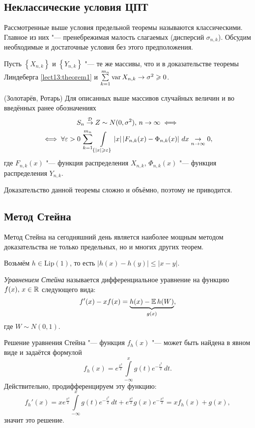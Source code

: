 \subsection{Неклассические условия ЦПТ}

Рассмотренные выше условия предельной теоремы называются классическими. Главное из них "--- пренебрежимая малость слагаемых (дисперсий $\sigma_{n, k}$). Обсудим необходимые и достаточные условия без этого предположения.

Пусть $\left\{X_{n, k}\right\}$ и $\left\{Y_{n, k}\right\}$ "--- те же массивы, что и в доказательстве теоремы Линдеберга \ref{lect13:theorem1} и $\sum\limits_{k = 1}^{m_n}\operatorname*{var} X_{n, k} \to \sigma^2 \geqslant 0$.
\begin{theorem}\label{lect13:theorem6}(Золотарёв, Ротарь)
Для описанных выше массивов случайных величин и во введённых ранее обозначениях 
\begin{multline*}
S_n \overset{\mathcal{D}}{\to} Z \sim N(0, \sigma^2),\, n \to \infty \iff
\\
\iff \forall \varepsilon > 0 \, \sum_{k = 1}^{m_n} \int\limits_{\left\{|x| \geqslant \varepsilon\right\}} |x| \left|F_{n, k}(x) - \Phi_{n, k}(x)\right|\, dx \underset{n \to \infty}{\to} 0,
\end{multline*}
где $F_{n, k}(x)$ "--- функция распределения $X_{n, k}$, $\Phi_{n, k}(x)$ "--- функция распределения $Y_{n, k}$.
\end{theorem} 
Доказательство данной теоремы сложно и объёмно, поэтому не приводится.
\subsection{Метод Стейна}
Метод Стейна на сегодняшний день является наиболее мощным методом доказательства не только предельных, но и многих других теорем.

Возьмём $h \in \text{Lip}(1)$, то есть $\left|h(x) - h(y)\right| \leqslant \left|x - y\right|$.
\begin{definition}\label{lect13:def1}
\textit{Уравнением Стейна} называется дифференциальное уравнение на функцию $f(x), \, x \in \mathbb{R}$ следующего вида:
$$
f'(x) - xf(x) = \underbrace{h(x) - \operatorname*{\mathbb{E}} h(W)}_{g(x)},
$$
где $W \sim N(0, 1)$.
\end{definition}
Решение уравнения Стейна "--- функция $f_h(x)$ "--- может быть найдена в явном виде и задаётся формулой
$$
f_h(x) = e^{\frac{x^2}{2}}\int\limits_{-\infty}^x g(t)e^{-\frac{t^2}{2}}\, dt.
$$
Действительно, продифференцируем эту функцию:
$$
f_h'(x) = xe^{\frac{x^2}{2}}\int\limits_{-\infty}^x g(t)e^{-\frac{t^2}{2}}\, dt + e^{\frac{x^2}{2}}g(x)e^{-\frac{x^2}{2}} = xf_h(x) + g(x),
$$
значит это решение.

